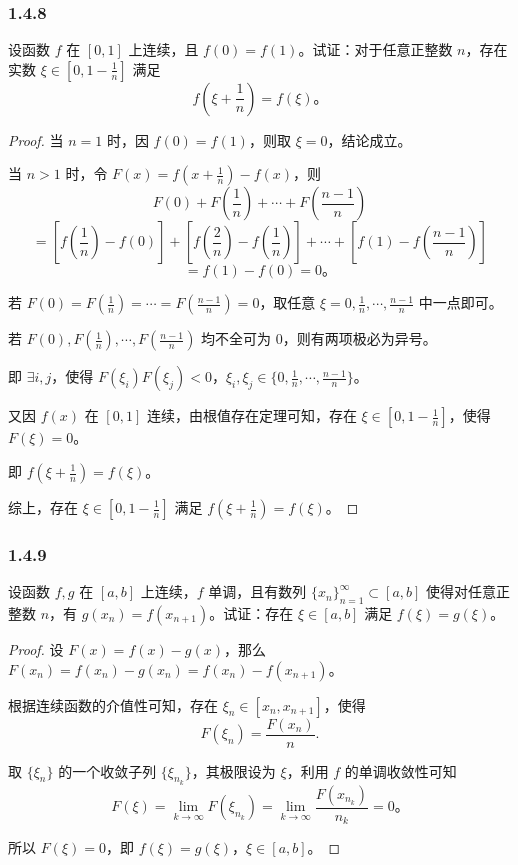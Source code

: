 \documentclass[12pt]{ctexart}
\begin{document}
\subsubsection*{1.4.8}
设函数 $f$ 在 $[0,1]$ 上连续，且 $f(0) = f(1)$。试证：对于任意正整数 $n$，存在实数 $\xi \in \left[0, 1 - \frac{1}{n}\right]$ 满足
\[
f\left(\xi + \frac{1}{n}\right) = f(\xi)。
\]

\begin{proof}
当 $n=1$ 时，因 $f(0) = f(1)$，则取 $\xi = 0$，结论成立。

当 $n > 1$ 时，令 $F(x) = f\left(x + \frac{1}{n}\right) - f(x)$，则
\[
F(0) + F\left(\frac{1}{n}\right) + \cdots + F\left(\frac{n-1}{n}\right) 
\]
\[
= [f\left(\frac{1}{n}\right) - f(0)] + [f\left(\frac{2}{n}\right) - f\left(\frac{1}{n}\right)] + \cdots + [f(1) - f\left(\frac{n-1}{n}\right)] 
\]
\[
= f(1) - f(0) = 0。
\]

若 $F(0) = F\left(\frac{1}{n}\right) = \cdots = F\left(\frac{n-1}{n}\right) = 0$，取任意 $\xi = 0, \frac{1}{n}, \cdots, \frac{n-1}{n}$ 中一点即可。

若 $F(0), F\left(\frac{1}{n}\right), \cdots, F\left(\frac{n-1}{n}\right)$ 均不全可为 $0$，则有两项极必为异号。

即 $\exists i, j$，使得 $F(\xi_i) F(\xi_j) < 0$，$\xi_i, \xi_j \in \{0, \frac{1}{n}, \cdots, \frac{n-1}{n}\}$。

又因 $f(x)$ 在 $[0,1]$ 连续，由根值存在定理可知，存在 $\xi \in \left[0, 1 - \frac{1}{n}\right]$，使得 $F(\xi) = 0$。

即 $f\left(\xi + \frac{1}{n}\right) = f(\xi)$。

综上，存在 $\xi \in \left[0, 1 - \frac{1}{n}\right]$ 满足 $f\left(\xi + \frac{1}{n}\right) = f(\xi)$。
\end{proof}

\subsubsection*{1.4.9}
设函数 $f, g$ 在 $[a, b]$ 上连续，$f$ 单调，且有数列 $\{x_n\}_{n=1}^\infty \subset [a, b]$ 使得对任意正整数 $n$，有 $g(x_n) = f(x_{n+1})$。试证：存在 $\xi \in [a, b]$ 满足 $f(\xi) = g(\xi)$。
\begin{proof}
设 $F(x) = f(x) - g(x)$，那么 $F(x_n) = f(x_n) - g(x_n) = f(x_n) - f(x_{n+1})$。

根据连续函数的介值性可知，存在 $\xi_n \in [x_n, x_{n+1}]$，使得
\[
F(\xi_n) = \frac{F(x_n)}{n}.
\]

取 $\{ \xi_n \}$ 的一个收敛子列 $\{ \xi_{n_k} \}$，其极限设为 $\xi$，利用 $f$ 的单调收敛性可知
\[
F(\xi) = \lim_{k \to \infty} F(\xi_{n_k}) = \lim_{k \to \infty} \frac{F(x_{n_k})}{n_k} = 0。
\]

所以 $F(\xi) = 0$，即 $f(\xi) = g(\xi)$，$\xi \in [a, b]$。
\end{proof}
\end{document}
